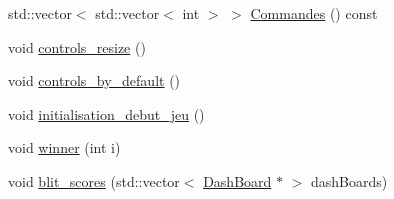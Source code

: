 \begin{DoxyCompactItemize}
\item 
std::vector$<$ std::vector$<$ int $>$ $>$ \hyperlink{a00011_a2770bc51029e6ac83600fb0db36147e1}{Commandes} () const 
\item 
void \hyperlink{a00011_a37bd38cd162a32848043875a181694df}{controls\_\-resize} ()
\item 
void \hyperlink{a00011_a516951c4ba06596e817c40113847b876}{controls\_\-by\_\-default} ()
\item 
void \hyperlink{a00011_ab36b304cac86159cb4b27e10fb35d9b8}{initialisation\_\-debut\_\-jeu} ()
\item 
void \hyperlink{a00011_a885bd9df47f9c00230fe13ad20ce29a7}{winner} (int i)
\item 
void \hyperlink{a00011_a8a4434fc2667bf4a413ad029c7b3861d}{blit\_\-scores} (std::vector$<$ \hyperlink{a00006}{DashBoard} $\ast$ $>$ dashBoards)
\end{DoxyCompactItemize}
